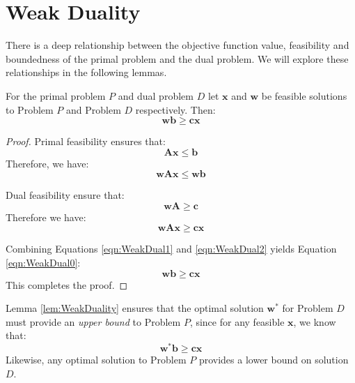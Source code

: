 \section{Weak Duality}
There is a deep relationship between the objective function value, feasibility and boundedness of the primal problem and the dual problem. We will explore these relationships in the following lemmas.

\begin{lemma} For the primal problem $P$ and dual problem $D$ let $\mathbf{x}$ and $\mathbf{w}$ be feasible solutions to Problem $P$ and Problem $D$ respectively. Then:
\begin{equation}
\mathbf{w}\mathbf{b} \geq \mathbf{c}\mathbf{x}
\label{eqn:WeakDual0}
\end{equation}
\label{lem:WeakDuality}
\end{lemma}
\begin{proof} Primal feasibility ensures that:
\begin{displaymath}
\mathbf{A}\mathbf{x} \leq \mathbf{b}
\end{displaymath}
Therefore, we have:
\begin{equation}
\mathbf{w}\mathbf{A}\mathbf{x} \leq \mathbf{w}\mathbf{b}
\label{eqn:WeakDual1}
\end{equation}

Dual feasibility ensure that:
\begin{displaymath}
\mathbf{w}\mathbf{A} \geq \mathbf{c}
\end{displaymath}
Therefore we have:
\begin{equation}
\mathbf{w}\mathbf{A}\mathbf{x} \geq \mathbf{c}\mathbf{x}
\label{eqn:WeakDual2}
\end{equation}

Combining Equations \ref{eqn:WeakDual1} and \ref{eqn:WeakDual2} yields Equation \ref{eqn:WeakDual0}:
\begin{displaymath}
\mathbf{w}\mathbf{b} \geq \mathbf{c}\mathbf{x}
\end{displaymath}
This completes the proof.
\end{proof}

\begin{remark}
Lemma \ref{lem:WeakDuality} ensures that the optimal solution $\mathbf{w}^*$ for Problem $D$ must provide an \textit{upper bound} to Problem $P$, since for any feasible $\mathbf{x}$, we know that:
\begin{equation}
\mathbf{w}^*\mathbf{b} \geq \mathbf{c}\mathbf{x}
\end{equation}
Likewise, any optimal solution to Problem $P$ provides a lower bound on solution $D$. 
\end{remark}

